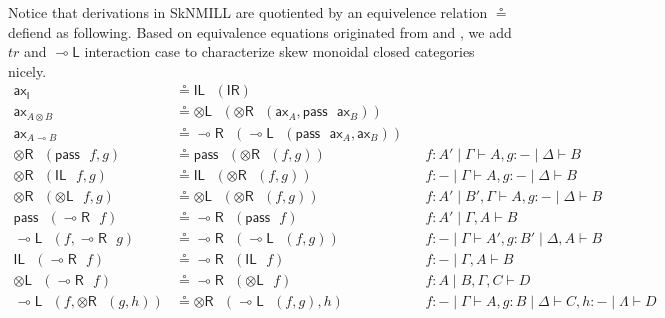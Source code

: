 \documentclass[submission,copyright,creativecommons]{eptcs}
\newcommand{\tl}{\otimes \mathsf{L}}
\newcommand{\tr}{\otimes \mathsf{R}}
\newcommand{\lright}{\multimap \mathsf{R}}
\newcommand{\lleft}{\multimap \mathsf{L}}
\newcommand{\pass}{\mathsf{pass}}
\newcommand{\unitl}{\mathsf{IL}}
\newcommand{\unitr}{\mathsf{IR}}
\newcommand{\ax}{\mathsf{ax}}
\newcommand{\ot}{\otimes}
\newcommand{\lolli}{\multimap}
\newcommand{\I}{\mathsf{I}}
\newcommand{\niccolo}[1]{{\color{red}\textbf{Niccol{\`o}: }#1}}
\begin{document}
Notice that derivations in SkNMILL are quotiented by an equivelence relation $\circeq$ defiend as following.
Based on equivalence equations originated from \cite{uustalu:sequent:2018} and \cite{uustalu:deductive:nodate}, we add $tr$ and $\lleft$ interaction case to characterize skew monoidal closed categories nicely.
\begin{align*}
  \ax_{\I} &\circeq \unitl \text{ } (\unitr)
  \\
  \ax_{A \ot B} &\circeq \tl \text{ } (\tr \text{ } (\ax_{A} , \pass \text{ } \ax_{B}))
  \\
  \ax_{A \lolli B} &\circeq \lright \text{ } (\lleft \text{ } (\pass \text{ } \ax_{A}, \ax_{B} ))
  \\
  \tr \text{ } (\pass \text{ } f, g) &\circeq \pass \text{ } (\tr \text{ } (f, g)) &&f : A' \mid \Gamma \vdash A, g : - \mid \Delta \vdash B
  \\
  \tr \text{ } (\unitl \text{ } f, g) &\circeq \unitl \text{ } (\tr \text{ } (f , g)) &&f : - \mid \Gamma \vdash A , g : - \mid \Delta \vdash B
  \\
  \tr \text{ } (\tl \text{ } f, g) &\circeq \tl \text{ } (\tr \text{ } (f , g)) &&f : A' \mid B' , \Gamma \vdash A , g : - \mid \Delta \vdash B
  \\
  \pass \text{ } (\lright \text{ } f) &\circeq \lright \text{ } (\pass \text{ } f) &&f : A' \mid \Gamma , A \vdash B
  \\
  \lleft \text{ } (f, \lright \text{ } g) &\circeq \lright \text{ } (\lleft \text{ } (f, g)) &&f : - \mid \Gamma \vdash A', g : B' \mid \Delta , A \vdash B
  \\
  \unitl \text{ } (\lright \text{ } f) &\circeq \lright \text{ } (\unitl \text{ } f) &&f : - \mid \Gamma , A \vdash B
  \\
  \tl \text{ } (\lright \text{ } f) &\circeq \lright \text{ } (\tl \text{ } f) &&f : A \mid B , \Gamma , C \vdash D
  \\
  \lleft \text{ } (f, \tr \text{ } (g, h)) &\circeq \tr \text{ } (\lleft \text{ } (f , g), h) &&f: - \mid \Gamma \vdash A, g : B \mid \Delta \vdash C, h : - \mid \Lambda \vdash D
\end{align*}

\end{document}

